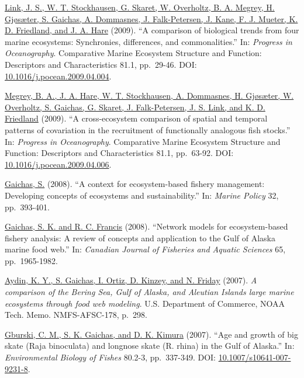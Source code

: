 \documentclass[11pt, a4paper]{awesome-cv}
\begin{document}
\protect\hyperlink{cite-link_comparison_2009}{Link, J. S., W. T.
Stockhausen, G. Skaret, W. Overholtz, B. A. Megrey, H. Gjøsæter, S.
Gaichas, A. Dommasnes, J. Falk-Petersen, J. Kane, F. J. Mueter, K. D.
Friedland, and J. A. Hare} (2009). ``A comparison of biological trends
from four marine ecosystems: Synchronies, differences, and
commonalities.'' In: \emph{Progress in Oceanography}. Comparative Marine
Ecosystem Structure and Function: Descriptors and Characteristics 81.1,
pp.~29-46. DOI:
\href{https://doi.org/10.1016\%2Fj.pocean.2009.04.004}{10.1016/j.pocean.2009.04.004}.

\protect\hyperlink{cite-megrey_cross-ecosystem_2009}{Megrey, B. A., J.
A. Hare, W. T. Stockhausen, A. Dommasnes, H. Gjøsæter, W. Overholtz, S.
Gaichas, G. Skaret, J. Falk-Petersen, J. S. Link, and K. D. Friedland}
(2009). ``A cross-ecosystem comparison of spatial and temporal patterns
of covariation in the recruitment of functionally analogous fish
stocks.'' In: \emph{Progress in Oceanography}. Comparative Marine
Ecosystem Structure and Function: Descriptors and Characteristics 81.1,
pp.~63-92. DOI:
\href{https://doi.org/10.1016\%2Fj.pocean.2009.04.006}{10.1016/j.pocean.2009.04.006}.

\protect\hyperlink{cite-gaichas_context_2008}{Gaichas, S.} (2008). ``A
context for ecosystem-based fishery management: Developing concepts of
ecosystems and sustainability.'' In: \emph{Marine Policy} 32,
pp.~393-401.

\protect\hyperlink{cite-gaichas_network_2008}{Gaichas, S. K. and R. C.
Francis} (2008). ``Network models for ecosystem-based fishery analysis:
A review of concepts and application to the Gulf of Alaska marine food
web.'' In: \emph{Canadian Journal of Fisheries and Aquatic Sciences} 65,
pp.~1965-1982.

\protect\hyperlink{cite-aydin_comparison_2007}{Aydin, K. Y., S. Gaichas,
I. Ortiz, D. Kinzey, and N. Friday} (2007). \emph{A comparison of the
Bering Sea, Gulf of Alaska, and Aleutian Islands large marine ecosystems
through food web modeling}. U.S. Department of Commerce, NOAA Tech.
Memo. NMFS-AFSC-178, p.~298.

\protect\hyperlink{cite-gburski_age_2007}{Gburski, C. M., S. K. Gaichas,
and D. K. Kimura} (2007). ``Age and growth of big skate (Raja
binoculata) and longnose skate (R. rhina) in the Gulf of Alaska.'' In:
\emph{Environmental Biology of Fishes} 80.2-3, pp.~337-349. DOI:
\href{https://doi.org/10.1007\%2Fs10641-007-9231-8}{10.1007/s10641-007-9231-8}.
\end{document}
